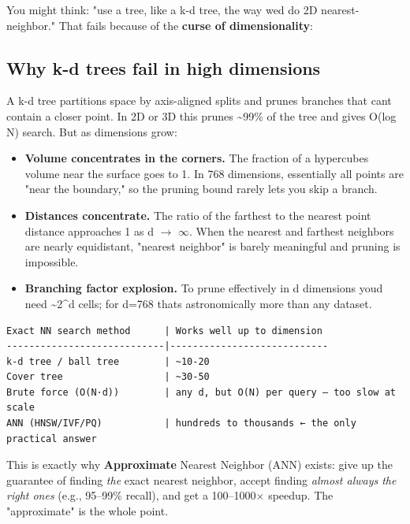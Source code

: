 \documentclass[11pt]{article}
\providecommand{\tightlist}{\setlength{\itemsep}{1pt}\setlength{\parskip}{0pt}}
\begin{document}
You might think: "use a tree, like a k-d tree, the way we\textquotesingle d do 2D nearest-neighbor." That fails because of the \textbf{curse of dimensionality}:

\subsection{Why k-d trees fail in high dimensions}\label{why-k-d-trees-fail-in-high-dimensions}

A k-d tree partitions space by axis-aligned splits and prunes branches that can\textquotesingle t contain a closer point. In 2D or 3D this prunes \textasciitilde99\% of the tree and gives O(log N) search. But as dimensions grow:

\begin{itemize}
\tightlist
\item
  \textbf{Volume concentrates in the corners.} The fraction of a hypercube\textquotesingle s volume near the surface goes to 1. In 768 dimensions, essentially all points are "near the boundary," so the pruning bound rarely lets you skip a branch.
\item
  \textbf{Distances concentrate.} The ratio of the farthest to the nearest point distance approaches 1 as d \(\rightarrow\) \(\infty\). When the nearest and farthest neighbors are nearly equidistant, "nearest neighbor" is barely meaningful and pruning is impossible.
\item
  \textbf{Branching factor explosion.} To prune effectively in d dimensions you\textquotesingle d need \textasciitilde2\^{}d cells; for d=768 that\textquotesingle s astronomically more than any dataset.
\end{itemize}

\setcodelang{}

\begin{verbatim}
Exact NN search method      | Works well up to dimension
----------------------------|----------------------------
k-d tree / ball tree        | ~10-20
Cover tree                  | ~30-50
Brute force (O(N·d))        | any d, but O(N) per query — too slow at scale
ANN (HNSW/IVF/PQ)           | hundreds to thousands ← the only practical answer
\end{verbatim}

This is exactly why \textbf{Approximate} Nearest Neighbor (ANN) exists: give up the guarantee of finding \emph{the} exact nearest neighbor, accept finding \emph{almost always the right ones} (e.g., 95--99\% recall), and get a 100--1000\(\times\) speedup. The "approximate" is the whole point.
\end{document}
